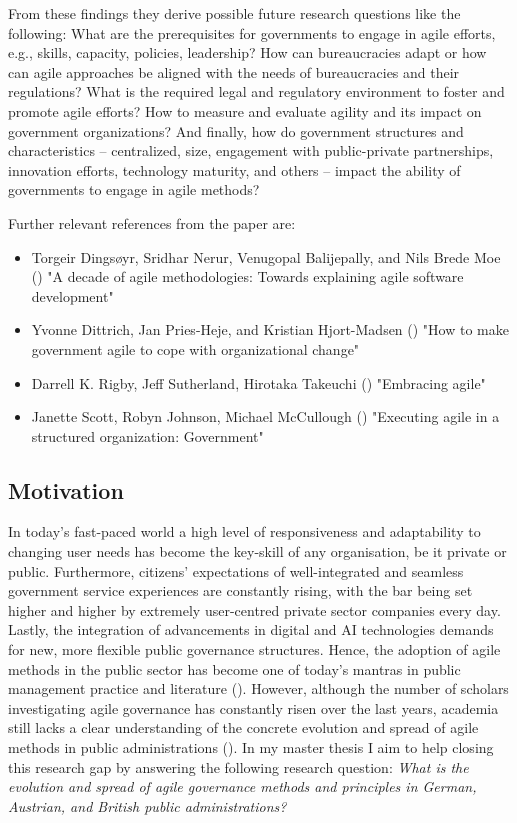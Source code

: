 \documentclass[a4paper]{article}
\begin{document}
\begin{spacing}{1.5}
From these findings they derive possible future research questions like the following: What are the prerequisites for governments to engage in agile efforts, e.g., skills, capacity, policies, leadership? How can bureaucracies adapt or how can agile approaches be aligned with the needs of bureaucracies and their regulations? What is the required legal and regulatory environment to foster and promote agile efforts? How to measure and evaluate agility and its impact on government organizations? And finally, how do government structures and characteristics – centralized, size, engagement with public-private partnerships, innovation efforts, technology maturity, and others – impact the ability of governments to engage in agile methods?\par 
Further relevant references from the paper are:
\begin{itemize}
  \setlength\itemsep{0.01em}
    \item Torgeir Dingsøyr, Sridhar Nerur, Venugopal Balijepally, and Nils Brede Moe (\cite*{Dingsoyr2012}) "A decade of agile methodologies: Towards explaining agile software development"
    \item Yvonne Dittrich, Jan Pries-Heje, and Kristian Hjort-Madsen (\cite*{Dittrich2005}) "How to make government agile to cope with organizational change"
    \item Darrell K. Rigby, Jeff Sutherland, Hirotaka Takeuchi (\cite*{Rigby2016}) "Embracing agile"
    \item Janette Scott, Robyn Johnson, Michael McCullough (\cite*{Scott2008}) "Executing agile in a structured organization: Government"
\end{itemize}

%
\subsection*{Motivation}
In today’s fast-paced world a high level of responsiveness and adaptability to changing user needs has become the key-skill of any organisation, be it private or public. Furthermore, citizens’ expectations of well-integrated and seamless government service experiences are constantly rising, with the bar being set higher and higher by extremely user-centred private sector companies every day. Lastly, the integration of advancements in digital and AI technologies demands for new, more flexible public governance structures. Hence, the adoption of agile methods in the public sector has become one of today’s mantras in public management practice and literature (\cite{Mergel2018, Vacari2015}). However, although the number of scholars investigating agile governance has constantly risen over the last years, academia still lacks a clear understanding of the concrete evolution and spread of agile methods in public administrations (\cite{Mergel2018}). In my master thesis I aim to help closing this research gap by answering the following research question: \textit{What is the evolution and spread of agile governance methods and principles in German, Austrian, and British public administrations?}
%

\end{spacing}
\end{document}
